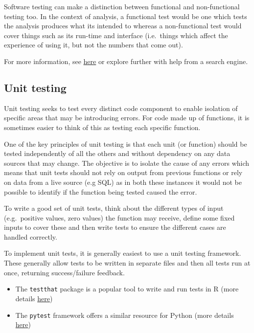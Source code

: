 \documentclass[
]{book}
\providecommand{\tightlist}{%
  \setlength{\itemsep}{0pt}\setlength{\parskip}{0pt}}
\begin{document}
Software testing can make a distinction between functional and non-functional testing too. In the context of analysis, a functional test would be one which tests the analysis produces what its intended to whereas a non-functional test would cover things such as its run-time and interface (i.e.~things which affect the experience of using it, but not the numbers that come out).

For more information, see \href{https://www.guru99.com/levels-of-testing.html}{here} or explore further with help from a search engine.

\hypertarget{unit-testing}{%
\subsection{Unit testing}\label{unit-testing}}

Unit testing seeks to test every distinct code component to enable isolation of specific areas that may be introducing errors. For code made up of functions, it is sometimes easier to think of this as testing each specific function.

One of the key principles of unit testing is that each unit (or function) should be tested independently of all the others and without dependency on any data sources that may change. The objective is to isolate the cause of any errors which means that unit tests should not rely on output from previous functions or rely on data from a live source (e.g SQL) as in both these instances it would not be possible to identify if the function being tested caused the error.

To write a good set of unit tests, think about the different types of input (e.g.~positive values, zero values) the function may receive, define some fixed inputs to cover these and then write tests to ensure the different cases are handled correctly.

To implement unit tests, it is generally easiest to use a unit testing framework. These generally allow tests to be written in separate files and then all tests run at once, returning success/failure feedback.

\begin{itemize}
\tightlist
\item
  The \texttt{testthat} package is a popular tool to write and run tests in R (more details \href{https://github.com/r-lib/testthat}{here})
\item
  The \texttt{pytest} framework offers a similar resource for Python (more details \href{https://docs.pytest.org/en/latest/}{here})
\end{itemize}
\end{document}
